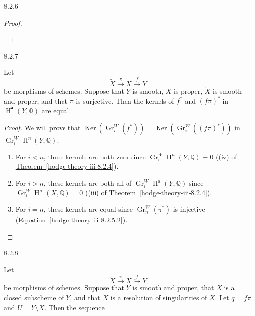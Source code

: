 \begin{proposition}{8.2.6}
\begin{proof}
\begin{enumerate}
      \end{enumerate}\end{proof}\end{proposition}\begin{proposition}{8.2.7}\label{hodge-theory-iii-8.2.7}\skipsinglepar\par{}Let
    \[       \widetilde {X}       \xrightarrow {\pi } X       \xrightarrow {f} Y     \]
    be morphisms of schemes.
    Suppose that \(Y\) is smooth, \(X\) is proper, \(\widetilde {X}\) is smooth and proper, and that \(\pi \) is surjective.
    Then the kernels of \(f^*\) and \((f\pi )^*\) in \(\operatorname {H}^\bullet (Y,\mathbb {Q})\) are equal.\begin{proof}\par{}We will prove that \(\operatorname {Ker}(\operatorname {Gr}_i^W(f^*))=\operatorname {Ker}(\operatorname {Gr}_i^W((f\pi )^*))\) in \(\operatorname {Gr}_i^W\operatorname {H}^n(Y,\mathbb {Q})\).

      
 \begin{enumerate}
        
 \item[(a)]
          For \(i<n\), these kernels are both zero since \(\operatorname {Gr}_i^W\operatorname {H}^n(Y,\mathbb {Q})=0\) ((iv) of \hyperref[hodge-theory-iii-8.2.4]{Theorem~\ref*{hodge-theory-iii-8.2.4}}).
        

        
 \item[(b)]
          For \(i>n\), these kernels are both all of \(\operatorname {Gr}_i^W\operatorname {H}^n(Y,\mathbb {Q})\) since \(\operatorname {Gr}_i^W\operatorname {H}^n(X,\mathbb {Q})=0\) ((iii) of \hyperref[hodge-theory-iii-8.2.4]{Theorem~\ref*{hodge-theory-iii-8.2.4}}).
        

        
 \item[(a)]
          For \(i=n\), these kernels are equal since \(\operatorname {Gr}_n^W(\pi ^*)\) is injective (\hyperref[hodge-theory-iii-8.2.5.2]{Equation~\ref*{hodge-theory-iii-8.2.5.2}}).
        

      \end{enumerate}\end{proof}\end{proposition}\begin{corollary}{8.2.8}\label{hodge-theory-iii-8.2.8}\skipsinglepar\par{}Let
    \[       \widetilde {X}       \xrightarrow {\pi } X       \overset {f}{\hookrightarrow } Y     \]
    be morphisms of schemes.
    Suppose that \(Y\) is smooth and proper, that \(X\) is a closed subscheme of \(Y\), and that \(\widetilde {X}\) is a resolution of singularities of \(X\).
    Let \(q=f\pi \) and \(U=Y\setminus  X\).
    Then the sequence


\end{corollary}
